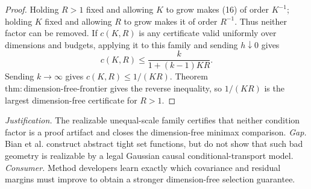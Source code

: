 \documentclass{article}
\begin{document}
\begin{proof}
Holding \(R>1\) fixed and allowing \(K\) to grow makes (16) of order \(K^{-1}\); holding \(K\) fixed and allowing \(R\) to grow makes it of order \(R^{-1}\). Thus neither factor can be removed. If \(c(K,R)\) is any certificate valid uniformly over dimensions and budgets, applying it to this family and sending \(h\downarrow0\) gives
\[
 c(K,R)\le\frac{k}{1+(k-1)KR}.
\]
Sending \(k\to\infty\) gives \(c(K,R)\le1/(KR)\). Theorem \(\mathrm{thm{:}dimension\text{-}free\text{-}frontier}\) gives the reverse inequality, so \(1/(KR)\) is the largest dimension-free certificate for \(R>1\).
\end{proof}
\par\smallskip\noindent \textit{Justification.} The realizable unequal-scale family certifies that neither condition factor is a proof artifact and closes the dimension-free minimax comparison. \textit{Gap.} Bian et al. construct abstract tight set functions, but do not show that such bad geometry is realizable by a legal Gaussian causal conditional-transport model. \textit{Consumer.} Method developers learn exactly which covariance and residual margins must improve to obtain a stronger dimension-free selection guarantee.
\end{document}
